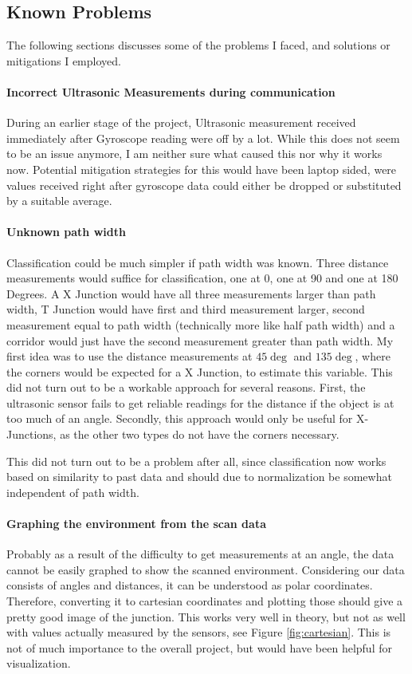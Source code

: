 \subsection{Known Problems}

The following sections discusses some of the problems I faced, and solutions or mitigations I employed.

\paragraph{Incorrect Ultrasonic Measurements during \IIC communication}
During an earlier stage of the project, Ultrasonic measurement received immediately after Gyroscope reading were off
by a lot.
While this does not seem to be an issue anymore, I am neither sure what caused this nor why it works now.
Potential mitigation strategies for this would have been laptop sided, were values received right after gyroscope data
could either be dropped or substituted by a suitable average.


\paragraph{Unknown path width}
Classification could be much simpler if path width was known. Three distance measurements would suffice for classification, one at 0, one at 90 and one at 180 Degrees.
A X Junction would have all three measurements larger than path width,
T Junction would have first and third measurement larger, second measurement equal to path width (technically more like half path width) and
a corridor would just have the second measurement greater than path width.
My first idea was to use the distance measurements at $45\deg$ and $135\deg$, where the corners would be expected for a X Junction, to estimate this variable.
This did not turn out to be a workable approach for several reasons.
First, the ultrasonic sensor fails to get reliable readings for the distance if the object is at too much of an angle.
Secondly, this approach would only be useful for X-Junctions, as the other two types do not have the corners necessary.

This did not turn out to be a problem after all, since classification now works based on similarity to past data and should due to normalization be somewhat independent of path width.

\paragraph{Graphing the environment from the scan data} Probably as a result of the difficulty to get measurements at an angle, the data cannot be easily graphed to show the scanned environment.
Considering our data consists of angles and distances, it can be understood as polar coordinates.
Therefore, converting it to cartesian coordinates and plotting those should give a pretty good image of the junction.
This works very well in theory, but not as well with values actually measured by the sensors, see Figure \ref{fig:cartesian}.
This is not of much importance to the overall project, but would have been helpful for visualization.

